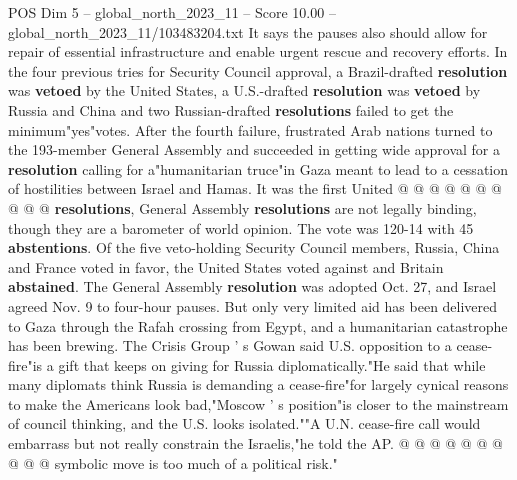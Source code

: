 \begin{textsample}{POS Dim 5 – global\_north\_2023\_11 – Score 10.00 – global\_north\_2023\_11/103483204.txt}
It says the pauses also should allow for repair of essential infrastructure and enable urgent rescue and recovery efforts.
In the four previous tries for Security Council approval, a Brazil-drafted \textbf{resolution} was \textbf{vetoed} by the United States, a U.S.-drafted \textbf{resolution} was \textbf{vetoed} by Russia and China and two Russian-drafted \textbf{resolutions} failed to get the minimum"yes"votes.
After the fourth failure, frustrated Arab nations turned to the 193-member General Assembly and succeeded in getting wide approval for a \textbf{resolution} calling for a"humanitarian truce"in Gaza meant to lead to a cessation of hostilities between Israel and Hamas.
It was the first United @ @ @ @ @ @ @ @ @ @ \textbf{resolutions}, General Assembly \textbf{resolutions} are not legally binding, though they are a barometer of world opinion.
The vote was 120-14 with 45 \textbf{abstentions}.
Of the five veto-holding Security Council members, Russia, China and France voted in favor, the United States voted against and Britain \textbf{abstained}.
The General Assembly \textbf{resolution} was adopted Oct. 27, and Israel agreed Nov. 9 to four-hour pauses.
But only very limited aid has been delivered to Gaza through the Rafah crossing from Egypt, and a humanitarian catastrophe has been brewing.
The Crisis Group ' s Gowan said U.S. opposition to a cease-fire"is a gift that keeps on giving for Russia diplomatically."He said that while many diplomats think Russia is demanding a cease-fire"for largely cynical reasons to make the Americans look bad,"Moscow ' s position"is closer to the mainstream of council thinking, and the U.S. looks isolated.""A U.N. cease-fire call would embarrass but not really constrain the Israelis,"he told the AP. @ @ @ @ @ @ @ @ @ @ symbolic move is too much of a political risk."

\end{textsample}

